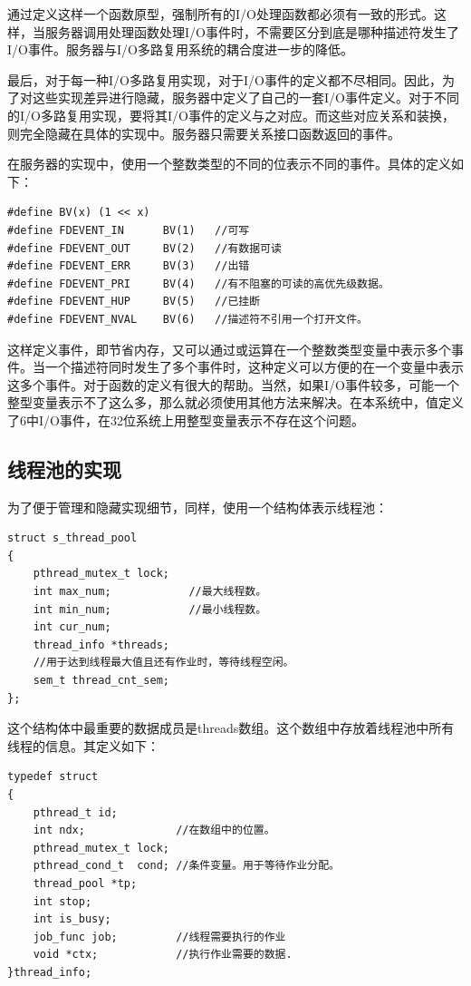 \documentclass[twoside, xetex]{report}
\begin{document}
	通过定义这样一个函数原型，强制所有的I/O处理函数都必须有一致的形式。这样，当服务器调用处理函数处理I/O事件时，不需要区分到底是哪种描述符发生了I/O事件。服务器与I/O多路复用系统的耦合度进一步的降低。
	
	最后，对于每一种I/O多路复用实现，对于I/O事件的定义都不尽相同。因此，为了对这些实现差异进行隐藏，服务器中定义了自己的一套I/O事件定义。对于不同的I/O多路复用实现，要将其I/O事件的定义与之对应。而这些对应关系和装换，则完全隐藏在具体的实现中。服务器只需要关系接口函数返回的事件。
	
	在服务器的实现中，使用一个整数类型的不同的位表示不同的事件。具体的定义如下：
\begin{lstlisting}	
#define BV(x) (1 << x)
#define FDEVENT_IN	  	BV(1) 	//可写
#define FDEVENT_OUT 	BV(2) 	//有数据可读
#define FDEVENT_ERR 	BV(3) 	//出错
#define FDEVENT_PRI 	BV(4) 	//有不阻塞的可读的高优先级数据。
#define FDEVENT_HUP 	BV(5) 	//已挂断
#define FDEVENT_NVAL	BV(6) 	//描述符不引用一个打开文件。
\end{lstlisting}

	这样定义事件，即节省内存，又可以通过或运算在一个整数类型变量中表示多个事件。当一个描述符同时发生了多个事件时，这种定义可以方便的在一个变量中表示这多个事件。对于函数的定义有很大的帮助。当然，如果I/O事件较多，可能一个整型变量表示不了这么多，那么就必须使用其他方法来解决。在本系统中，值定义了6中I/O事件，在32位系统上用整型变量表示不存在这个问题。
	
\subsection{线程池的实现}
	为了便于管理和隐藏实现细节，同样，使用一个结构体表示线程池：

\begin{lstlisting}
struct s_thread_pool
{
	pthread_mutex_t lock; 
	int max_num;            //最大线程数。
	int min_num;            //最小线程数。
	int cur_num; 
	thread_info *threads;
	//用于达到线程最大值且还有作业时，等待线程空闲。
	sem_t thread_cnt_sem;   
};
\end{lstlisting}

	这个结构体中最重要的数据成员是threads数组。这个数组中存放着线程池中所有线程的信息。其定义如下：
\begin{lstlisting}	
typedef struct 
{
	pthread_t id; 
	int ndx;              //在数组中的位置。
	pthread_mutex_t lock; 
	pthread_cond_t  cond; //条件变量。用于等待作业分配。
	thread_pool *tp;
	int stop;
	int is_busy;
	job_func job;         //线程需要执行的作业
	void *ctx;            //执行作业需要的数据.
}thread_info;
\end{lstlisting}
\end{document}
